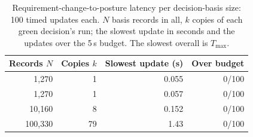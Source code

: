 \begin{table}[pos=tbp]
\centering\small
\caption{Requirement-change-to-posture latency per decision-basis size: 100 timed updates each. $N$ basis records in all, $k$ copies of each green decision's run; the slowest update in seconds and the updates over the 5\,s budget. The slowest overall is $T_{\max}$.}
\label{tab:scale-results}
\begin{tabular*}{\columnwidth}{@{\extracolsep{\fill}}rrrr@{}}
\toprule
Records $N$ & Copies $k$ & Slowest update (s) & Over budget \\
\midrule
1,270 & 1 & 0.055 & 0/100 \\
1,270 & 1 & 0.057 & 0/100 \\
10,160 & 8 & 0.152 & 0/100 \\
100,330 & 79 & 1.43 & 0/100 \\
\bottomrule
\end{tabular*}
\end{table}
